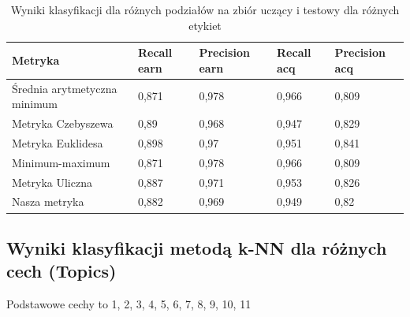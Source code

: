 \documentclass{classrep}
\begin{document}
{\begin{table}[H]
\begin{center}
\caption{Wyniki klasyfikacji dla różnych podziałów na zbiór uczący i testowy dla różnych etykiet}
\begin{tabular}{|l|l|l|l|l|}
\hline
\textbf{Metryka}             & \textbf{Recall earn} & \textbf{Precision earn} & \textbf{Recall acq} & \textbf{Precision acq} \\ \hline
Średnia arytmetyczna minimum & 0,871                & 0,978                   & 0,966               & 0,809                  \\ \hline
Metryka   Czebyszewa         & 0,89                 & 0,968                   & 0,947               & 0,829                  \\ \hline
Metryka Euklidesa            & 0,898                & 0,97                    & 0,951               & 0,841                  \\ \hline
Minimum-maximum              & 0,871                & 0,978                   & 0,966               & 0,809                  \\ \hline
Metryka Uliczna              & 0,887                & 0,971                   & 0,953               & 0,826                  \\ \hline
Nasza   metryka              & 0,882                & 0,969                   & 0,949               & 0,82                   \\ \hline
\end{tabular}
\end{center}
\end{table}

\subsection{Wyniki klasyfikacji metodą k-NN dla różnych cech (Topics)}

Podstawowe cechy to 1, 2, 3, 4, 5, 6, 7, 8, 9, 10, 11

}
\end{document}
